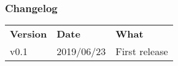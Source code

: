 \documentclass[12pt]{article}
\begin{document}
\subsubsection*{Changelog}

\begin{table}[!ht]
\begin{tabular}{lll}
\textbf{Version} & \textbf{Date} & \textbf{What} \\
v0.1    & 2019/06/23 & First release
\end{tabular}
\end{table}
\end{document}
